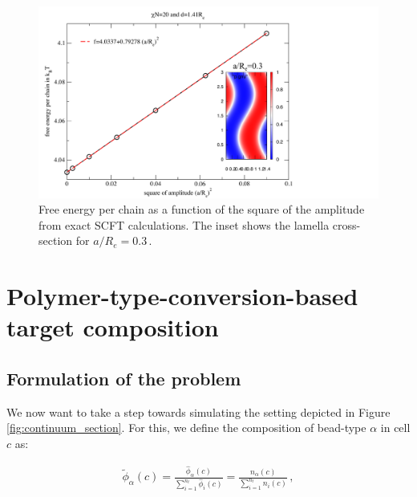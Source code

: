 \documentclass[bachelor,       %
               twoside,        %
               BCOR10mm,       %
               ngerman, english %
               ]{GAUBM}
\begin{document}





\begin{figure}[H]
    \centering
    \includegraphics[width=0.6\linewidth]{figures/bend_scft.pdf}
    \caption{Free energy per chain as a function of the square of the amplitude from exact \ac{SCFT} calculations. The inset shows the lamella cross-section for $a/R_e=0.3\,.$}
    \label{fig:bend_scft}
\end{figure}


\chapter{Polymer-type-conversion-based target composition}
\section{Formulation of the problem}
We now want to take a step towards simulating the setting depicted in Figure \ref{fig:continuum_section}. For this, we define the composition of bead-type $\alpha$ in cell $c$ as:

\begin{align}
    \tilde\phi_\alpha(c)=\frac{\hat\phi_\alpha(c)}{\sum_{i=1}^{n_t}\hat\phi_i(c)}=\frac{n_\alpha(c)}{\sum_{i=1}^{n_t}n_i(c)}\,,
\end{align}
\end{document}
